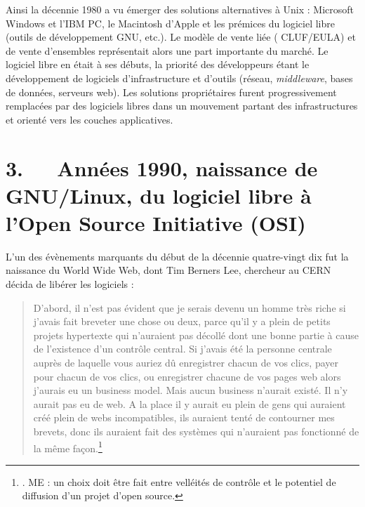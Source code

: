 \documentclass{FramateX}
\begin{document}
\begin{refsection}
Ainsi la décennie 1980 a vu émerger des solutions alternatives à Unix :
Microsoft Windows et l'IBM PC, le Macintosh
d'Apple et les prémices du logiciel libre (outils
de développement GNU, etc.). Le modèle de vente liée ( CLUF/EULA) et de
vente d'ensembles représentait alors une part
importante du marché. Le logiciel libre en était à ses débuts, la
priorité des développeurs étant le développement de logiciels
d'infrastructure et d'outils (réseau,
\textit{middleware}, bases de données, serveurs web). Les solutions
propriétaires furent progressivement remplacées par des logiciels
libres dans un mouvement partant des infrastructures et orienté vers
les couches applicatives.

\section*{3.~~~Années 1990, naissance de GNU/Linux, du logiciel libre à l'Open Source Initiative (OSI)}
{}

L'un des évènements marquants du début de la décennie quatre-vingt dix
fut la naissance du World Wide Web, dont Tim Berners Lee, chercheur au
CERN décida de libérer les logiciels :

\begin{quote}
D'abord, il n'est pas
évident que je serais devenu un homme très riche si
j'avais fait breveter une chose ou deux, parce
qu'il y a plein de petits projets hypertexte qui
n'auraient pas décollé dont une bonne partie à cause
de l'existence d'un contrôle central.
Si j'avais été la personne centrale auprès de laquelle
vous auriez dû enregistrer chacun de vos clics, payer pour chacun de
vos clics, ou enregistrer chacune de vos pages web alors
j'aurais eu un business model. Mais aucun business
n'aurait existé. Il n'y aurait pas eu
de web. A la place il y aurait eu plein de gens qui auraient créé plein
de webs incompatibles, ils auraient tenté de contourner mes brevets,
donc ils auraient fait des systèmes qui n'auraient pas
fonctionné de la même façon.\footnote{\cite{berners-leewriting2007}. ME : un
choix doit être fait entre velléités de contrôle et le potentiel de
diffusion d'un projet d'open source.} 
\end{quote}



\end{refsection}
\end{document}

